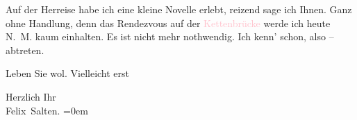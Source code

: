 \pstart
           Auf der Herreise habe ich eine kleine Novelle erlebt, reizend sage {\pb}ich Ihnen. Ganz ohne Handlung,
               denn das Rendezvous auf der \textcolor{pink}{Kettenbrücke}{}\ledrightnote{\textcolor{pink}{Kettenbrücke}} werde
               ich heute N. M. kaum einhalten. Es ist nicht mehr nothwendig. Ich kenn’
                  \label{K_L03108-2v}\label{K_L03108-2h} schon, also –
               abtreten.\pend
           
\pstart
           Leben Sie wol. Vielleicht erst \label{K_L03108-3v}\label{K_L03108-3h}\pend
           
\pstart
           Herzlich Ihr {\\[\baselineskip]}\spacefill\mbox{Felix Salten.}\pend
           \leftskip=0em{}\endnumbering{}  
      